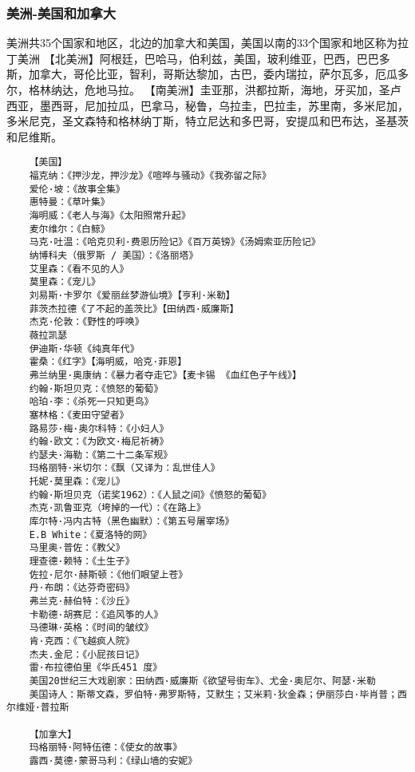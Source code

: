 \documentclass[UTF8]{../RepresentationUniverse}
\begin{document}
\subsubsection{美洲-美国和加拿大}
美洲共35个国家和地区，北边的加拿大和美国，美国以南的33个国家和地区称为拉丁美洲
    【北美洲】阿根廷，巴哈马，伯利兹，美国，玻利维亚，巴西，巴巴多斯，加拿大，哥伦比亚，智利，哥斯达黎加，古巴，委内瑞拉，萨尔瓦多，厄瓜多尔，格林纳达，危地马拉。
    【南美洲】圭亚那，洪都拉斯，海地，牙买加，圣卢西亚，墨西哥，尼加拉瓜，巴拿马，秘鲁，乌拉圭，巴拉圭，苏里南，多米尼加，多米尼克，圣文森特和格林纳丁斯，特立尼达和多巴哥，安提瓜和巴布达，圣基茨和尼维斯。
\begin{lstlisting}
    【美国】
    福克纳：《押沙龙，押沙龙》《喧哗与骚动》《我弥留之际》
    爱伦·坡：《故事全集》
    惠特曼：《草叶集》
    海明威：《老人与海》《太阳照常升起》
    麦尔维尔：《白鲸》
    马克·吐温：《哈克贝利·费恩历险记》《百万英镑》《汤姆索亚历险记》
    纳博科夫（俄罗斯 / 美国）：《洛丽塔》
    艾里森：《看不见的人》
    莫里森：《宠儿》
    刘易斯·卡罗尔《爱丽丝梦游仙境》【亨利·米勒】
    菲茨杰拉德《了不起的盖茨比》【田纳西·威廉斯】
    杰克·伦敦：《野性的呼唤》
    薇拉凯瑟
    伊迪斯·华顿《纯真年代》
    霍桑：《红字》【海明威，哈克·菲恩】
    弗兰纳里·奥康纳：《暴力者夺走它》【麦卡锡 《血红色子午线》】
    约翰·斯坦贝克：《愤怒的葡萄》
    哈珀·李：《杀死一只知更鸟》
    塞林格：《麦田守望者》
    路易莎·梅·奥尔科特：《小妇人》
    约翰·欧文：《为欧文·梅尼祈祷》
    约瑟夫·海勒：《第二十二条军规》
    玛格丽特·米切尔：《飘（又译为：乱世佳人》
    托妮·莫里森：《宠儿》
    约翰·斯坦贝克（诺奖1962）：《人鼠之间》《愤怒的葡萄》
    杰克·凯鲁亚克（垮掉的一代）：《在路上》
    库尔特·冯内古特（黑色幽默）：《第五号屠宰场》
    E.B White：《夏洛特的网》
    马里奥·普佐：《教父》
    理查德·赖特：《土生子》
    佐拉·尼尔·赫斯顿：《他们眼望上苍》
    丹·布朗：《达芬奇密码》
    弗兰克·赫伯特：《沙丘》
    卡勒德·胡赛尼：《追风筝的人》
    马德琳·英格：《时间的皱纹》
    肯·克西：《飞越疯人院》
    杰夫.金尼：《小屁孩日记》
    雷·布拉德伯里《华氏451 度》
    美国20世纪三大戏剧家：田纳西·威廉斯《欲望号街车》、尤金·奥尼尔、阿瑟·米勒
    美国诗人：斯蒂文森，罗伯特·弗罗斯特，艾默生；艾米莉·狄金森；伊丽莎白·毕肖普；西尔维娅·普拉斯

    【加拿大】
    玛格丽特·阿特伍德：《使女的故事》
    露西·莫德·蒙哥马利：《绿山墙的安妮》
    
\end{lstlisting}
\end{document}
